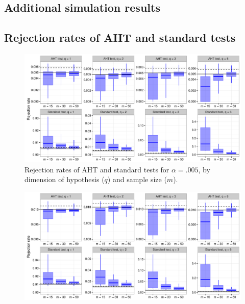 \documentclass{article}\usepackage[]{graphicx}\usepackage[]{color}
\newenvironment{knitrout}{}{} %
\begin{document}
\begin{landscape}
\section{Additional simulation results}



\subsection{Rejection rates of AHT and standard tests}

\begin{knitrout}
\color{fgcolor}\begin{figure}[H]

{\centering \includegraphics[width=\linewidth]{CR_fig/overview_005-1} 

}

\caption[Rejection rates of AHT and standard tests for ]{Rejection rates of AHT and standard tests for $\alpha = .005$, by dimension of hypothesis ($q$) and sample size ($m$).}\label{fig:overview_005}
\end{figure}


\end{knitrout}

\begin{knitrout}
\color{fgcolor}\begin{figure}[H]

{\centering \includegraphics[width=\linewidth]{CR_fig/overview_01-1} 

}
\end{figure}
\end{knitrout}
\end{landscape}
\end{document}
